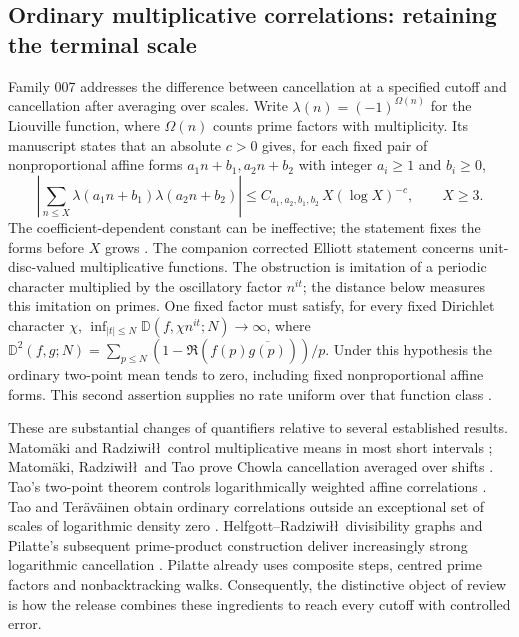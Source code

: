 
\subsection{Ordinary multiplicative correlations: retaining the terminal scale}
\label{sec:frontiers-ordinary-correlations}

Family 007 addresses the difference between cancellation at a specified cutoff
and cancellation after averaging over scales. Write $\lambda(n)=(-1)^{\Omega(n)}$
for the Liouville function, where $\Omega(n)$ counts prime factors with
multiplicity. Its manuscript states that an
absolute $c>0$ gives, for each fixed pair of nonproportional affine forms
$a_1n+b_1,a_2n+b_2$ with integer $a_i\geq1$ and $b_i\geq0$,
\[
 \left|\sum_{n\leq X}\lambda(a_1n+b_1)\lambda(a_2n+b_2)\right|
 \leq C_{a_1,a_2,b_1,b_2}\,X(\log X)^{-c},\qquad X\geq3.
\]
The coefficient-dependent constant can be ineffective; the statement fixes
the forms before $X$ grows \cite{arithOpenAI007}. The companion corrected
Elliott statement concerns unit-disc-valued multiplicative functions.
The obstruction is imitation of a periodic character multiplied by the
oscillatory factor $n^{it}$; the distance below measures this imitation
on primes. One fixed factor must satisfy, for every fixed Dirichlet character $\chi$,
$\inf_{|t|\leq N}\mathbb D(f,\chi n^{it};N)\to\infty$, where
$\mathbb D^2(f,g;N)=\sum_{p\leq N}(1-\Re(f(p)\overline{g(p)}))/p$.
Under this hypothesis the ordinary two-point mean tends to zero, including
fixed nonproportional affine forms. This second assertion supplies no rate
uniform over that function class \cite{arithOpenAI007}.

These are substantial changes of quantifiers relative to several established
results. Matom\"aki and Radziwi\l\l\ control multiplicative means in most
short intervals \cite{arithMR2016}; Matom\"aki, Radziwi\l\l\ and Tao prove
Chowla cancellation averaged over shifts \cite{arithMRT2015}. Tao's
two-point theorem controls logarithmically weighted affine correlations
\cite{arithTao2016}. Tao and Ter\"av\"ainen obtain ordinary correlations
outside an exceptional set of scales of logarithmic density zero
\cite{arithTT2019}. Helfgott--Radziwi\l\l\ divisibility graphs and
Pilatte's subsequent prime-product construction deliver increasingly strong
logarithmic cancellation \cite{arithHR2021,arithPilatte2026}. Pilatte already
uses composite steps, centred prime factors and nonbacktracking walks.
Consequently, the distinctive object of review is how the release combines
these ingredients to reach every cutoff with controlled error.

